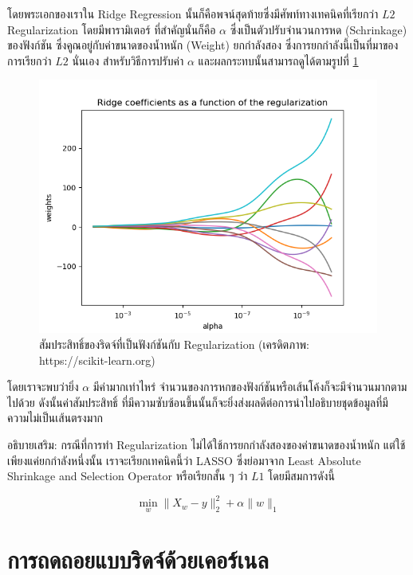 \noindent โดยพระเอกของเราใน Ridge Regression นั้นก็คือพจน์สุดท้ายซึ่งมีศัพท์ทางเทคนิคที่เรียกว่า $L2$ Regularization โดยมีพารามิเตอร์%
ที่สำคัญนั่นก็คือ $\alpha$ ซึ่งเป็นตัวปรับจำนวนการหด (Schrinkage) ของฟังก์ชัน ซึ่งคูณอยู่กับค่าขนาดของน้ำหนัก (Weight) ยกกำลังสอง
ซึ่งการยกกำลังนี้เป็นที่มาของการเรียกว่า $L2$ นั่นเอง สำหรับวิธีการปรับค่า $\alpha$ และผลกระทบนั้นสามารถดูได้ตามรูปที่ \ref{fig:ridge_res}

\begin{figure}[H]
    \centering
    \includegraphics[width=0.8\linewidth]{fig/plot_ridge_regression.png}
    \caption{สัมประสิทธิ์ของริดจ์ที่เป็นฟังก์ชันกับ Regularization (เครดิตภาพ: https://scikit-learn.org)}
    \label{fig:ridge_res}
\end{figure}

\noindent โดยเราจะพบว่ายิ่ง $\alpha$ มีค่ามากเท่าไหร่ จำนวนของการหกของฟังก์ชันหรือเส้นโค้งก็จะมีจำนวนมากตามไปด้วย ดังนั้นค่าสัมประสิทธิ์
ที่มีความซับซ้อนขึ้นนั้นก็จะยิ่งส่งผลดีต่อการนำไปอธิบายชุดข้อมูลที่มีความไม่เป็นเส้นตรงมาก

อธิบายเสริม: กรณีที่การทำ Regularization ไม่ได้ใช้การยกกำลังสองของค่าขนาดของน้ำหนัก แต่ใช้เพียงแค่ยกกำลังหนึ่งนั้น เราจะเรียกเทคนิคนี้ว่า
LASSO ซึ่งย่อมาจาก Least Absolute Shrinkage and Selection Operator หรือเรียกสั้น ๆ ว่า $L1$ โดยมีสมการดังนี้

\begin{equation}
    \min_{w} \lVert X_{w} - y \rVert_{2}^{2} + \alpha \lVert w \rVert_{1}
\end{equation}

\section{การถดถอยแบบริดจ์ด้วยเคอร์เนล}
\label{sec:kernel_ridge}

